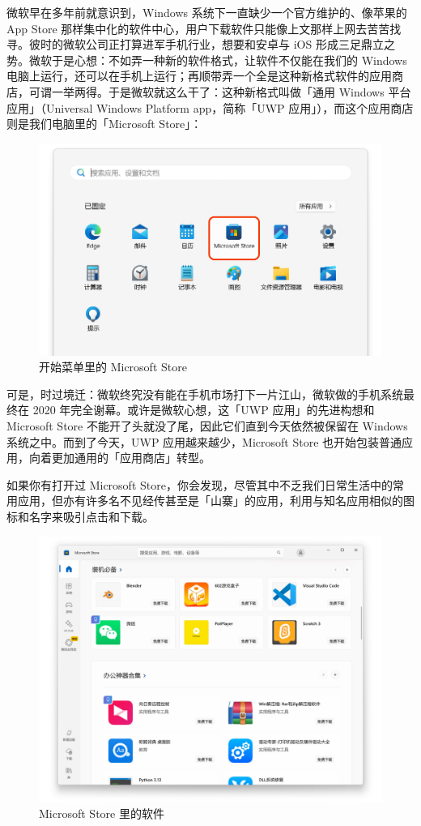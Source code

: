 {{微软早在多年前就意识到，Windows 系统下一直缺少一个官方维护的、像苹果的 App Store 那样集中化的软件中心，用户下载软件只能像上文那样上网去苦苦找寻。彼时的微软公司正打算进军手机行业，想要和安卓与 iOS 形成三足鼎立之势。微软于是心想：不如弄一种新的软件格式，让软件不仅能在我们的 Windows 电脑上运行，还可以在手机上运行；再顺带弄一个全是这种新格式软件的应用商店，可谓一举两得。于是微软就这么干了：这种新格式叫做「通用 Windows 平台应用」（Universal Windows Platform app，简称「UWP 应用」），而这个应用商店则是我们电脑里的「Microsoft Store」：

\begin{figure}[htb!]
  \centering
  \includegraphics[width=.7\textwidth]{assets/basic/Microsoft_Store.png}
  \caption{开始菜单里的 Microsoft Store}
  \label{fig:Microsoft_Store}
\end{figure}

可是，时过境迁：微软终究没有能在手机市场打下一片江山，微软做的手机系统最终在 2020 年完全谢幕。或许是微软心想，这「UWP 应用」的先进构想和 Microsoft Store 不能开了头就没了尾，因此它们直到今天依然被保留在 Windows 系统之中。而到了今天，UWP 应用越来越少，Microsoft Store 也开始包装普通应用，向着更加通用的「应用商店」转型。

如果你有打开过 Microsoft Store，你会发现，尽管其中不乏我们日常生活中的常用应用，但亦有许多名不见经传甚至是「山寨」的应用，利用与知名应用相似的图标和名字来吸引点击和下载。

\begin{figure}[htb!]
  \centering
  \includegraphics[width=.7\textwidth]{assets/basic/MS_Store_Content.png}
  \caption{Microsoft Store 里的软件}
  \label{fig:MS_Store_Content}
\end{figure}

}}
